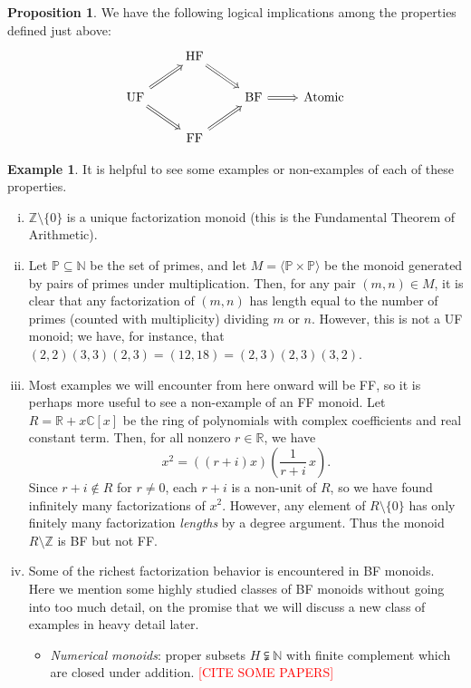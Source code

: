 \documentclass{report}
\newcommand{\NN}{\mathbb{N}}
\newcommand{\ZZ}{\mathbb{Z}}
\newcommand{\gen}[1]{\langle #1 \rangle}
\renewcommand{\:}{\text{:}}
\theoremstyle{definition}
\newtheorem{prop}[defn]{Proposition}
\newtheorem{eg}[defn]{Example}
\begin{document}
\begin{prop}
We have the following logical implications among the properties defined just above:
\[\begin{tikzcd}[arrows = Rightarrow]
 & \text{HF} \arrow{dr}&  &  \\
\text{UF} \arrow{ur}\arrow{dr}  &  & \text{BF} \arrow{r}& \text{Atomic} \\
 & \text{FF} \arrow{ur} &  & 
\end{tikzcd}\]
\end{prop}



\begin{eg}
It is helpful to see some examples or non-examples of each of these properties.
\begin{enumerate}[(i)]
\item $\ZZ\setminus \{0\}$ is a unique factorization monoid (this is the Fundamental Theorem of Arithmetic).
\item Let $\mathbb{P} \subseteq \NN$ be the set of primes, and let $M = \gen{\mathbb{P}\times \mathbb{P}}$ be the monoid generated by pairs of primes under multiplication.  
Then, for any pair $(m,n)\in M$, it is clear that any factorization of $(m,n)$ has length equal to the number of primes (counted with multiplicity) dividing $m$ or $n$.
However, this is not a UF monoid; we have, for instance, that $(2,2)(3,3)(2,3) = (12,18) = (2,3)(2,3)(3,2)$.
\item Most examples we will encounter from here onward will be FF, so it is perhaps more useful to see a non-example of an FF monoid.
Let $R = \mathbb{R} + x \mathbb{C}[x]$ be the ring of polynomials with complex coefficients and real constant term.
Then, for all nonzero $r\in \mathbb{R}$, we have
\[ x^2 = ((r+i)x)\left(\frac{1}{r+i}\,x\right). \]
Since $r+i\notin R$ for $r\neq0$, each $r+i$ is a non-unit of $R$, so we have found infinitely many factorizations of $x^2$.
However, any element of $R\setminus \{0\}$ has only finitely many factorization \textit{lengths} by a degree argument.
Thus the monoid $R\setminus \mathbb{Z}$ is BF but not FF.
\item Some of the richest factorization behavior is encountered in BF monoids.  
Here we mention some highly studied classes of BF monoids without going into too much detail, on the promise that we will discuss a new class of examples in heavy detail later.
\begin{itemize}
\item \textit{Numerical monoids}: proper subsets $H \subsetneqq \NN$ with finite complement which are closed under addition. \textcolor{red}{[CITE SOME PAPERS]}

\end{itemize}
\end{enumerate}
\end{eg}
\end{document}
